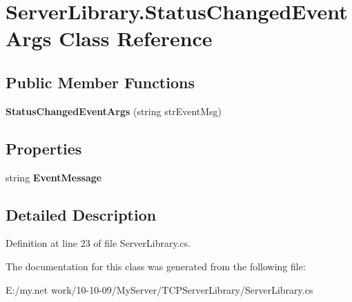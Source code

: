 \hypertarget{class_server_library_1_1_status_changed_event_args}{
\section{ServerLibrary.StatusChangedEventArgs Class Reference}
\label{class_server_library_1_1_status_changed_event_args}
}
\subsection*{Public Member Functions}
\begin{DoxyCompactItemize}
\item 
\hypertarget{class_server_library_1_1_status_changed_event_args_a1351c9b2768bba0990b41621ba4bee09}{
{\bfseries StatusChangedEventArgs} (string strEventMsg)}
\label{class_server_library_1_1_status_changed_event_args_a1351c9b2768bba0990b41621ba4bee09}

\end{DoxyCompactItemize}
\subsection*{Properties}
\begin{DoxyCompactItemize}
\item 
\hypertarget{class_server_library_1_1_status_changed_event_args_a2688a86acf251c6f1c209a03a27cbccb}{
string {\bfseries EventMessage}}
\label{class_server_library_1_1_status_changed_event_args_a2688a86acf251c6f1c209a03a27cbccb}

\end{DoxyCompactItemize}


\subsection{Detailed Description}


Definition at line 23 of file ServerLibrary.cs.

The documentation for this class was generated from the following file:\begin{DoxyCompactItemize}
\item 
E:/my.net work/10-\/10-\/09/MyServer/TCPServerLibrary/ServerLibrary.cs\end{DoxyCompactItemize}
